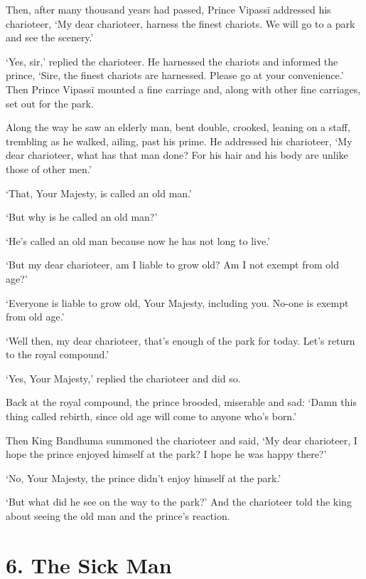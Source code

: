 \documentclass[12pt,openany]{book}%
\begin{document}
Then, after many thousand years had passed, Prince \textsanskrit{Vipassī} addressed his charioteer, ‘My dear charioteer, harness the finest chariots. We will go to a park and see the scenery.’ 

‘Yes, sir,’ replied the charioteer. He harnessed the chariots and informed the prince, ‘Sire, the finest chariots are harnessed. Please go at your convenience.’ Then Prince \textsanskrit{Vipassī} mounted a fine carriage and, along with other fine carriages, set out for the park. 

Along the way he saw an elderly man, bent double, crooked, leaning on a staff, trembling as he walked, ailing, past his prime. He addressed his charioteer, ‘My dear charioteer, what has that man done? For his hair and his body are unlike those of other men.’ 

‘That, Your Majesty, is called an old man.’ 

‘But why is he called an old man?’ 

‘He’s called an old man because now he has not long to live.’ 

‘But my dear charioteer, am I liable to grow old? Am I not exempt from old age?’ 

‘Everyone is liable to grow old, Your Majesty, including you. No-one is exempt from old age.’ 

‘Well then, my dear charioteer, that’s enough of the park for today. Let’s return to the royal compound.’ 

‘Yes, Your Majesty,’ replied the charioteer and did so. 

Back at the royal compound, the prince brooded, miserable and sad: ‘Damn this thing called rebirth, since old age will come to anyone who’s born.’ 

Then King Bandhuma summoned the charioteer and said, ‘My dear charioteer, I hope the prince enjoyed himself at the park? I hope he was happy there?’ 

‘No, Your Majesty, the prince didn’t enjoy himself at the park.’ 

‘But what did he see on the way to the park?’ And the charioteer told the king about seeing the old man and the prince’s reaction. 

\section*{6. The Sick Man }
\end{document}
